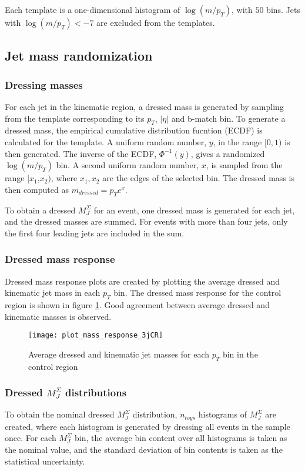 Each template is a one-dimensional histogram of $\log\left(m/p_{T}\right)$,
with $50$ bins. Jets with $\log\left(m/p_{T}\right)< -7$ are excluded
from the templates.
\subsection{Jet mass randomization}
\subsubsection{Dressing masses}
For each jet in the kinematic region, a dressed mass is generated by sampling from
the template corresponding to its $p_T$, $|\eta|$ and b-match bin. To
generate a dressed mass, the empirical cumulative distribution fucntion (ECDF)
is calculated for the template. A uniform random number, $y$, in the
range $[0,1)$ is then
generated. The inverse of the ECDF, $\Phi^{-1}(y)$, gives a randomized
$\log\left(m/p_T\right)$ bin. A second uniform random number, $x$, is sampled from the range
$[x_1$,$x_2)$, where $x_1,x_2$ are the edges of the selected bin. The
dressed mass is then computed as $m_{dressed} = p_{T}e^x$.

To obtain a dressed $M_{J}^{\Sigma}$ for an event, one dressed mass is
generated for each jet, and the dressed masses are summed. For
events with more than four jets, only the first four leading jets are
included in the sum.

\subsubsection{Dressed mass response}
Dressed mass response plots are created by plotting the average
dressed and kinematic jet mass in each $p_T$ bin. The dressed mass
response for the control region is shown in figure
\ref{fig:response_3jCR}. Good agreement between average dressed and
kinematic masses is observed. 

\begin{figure}[h]
\texttt{[image: plot\_mass\_response\_3jCR]}
\centering
\caption{Average dressed and kinematic jet masses for each $p_T$ bin
  in the control region}
\label{fig:response_3jCR}

\end{figure}

\subsubsection{Dressed $M_{J}^{\Sigma}$ distributions}
To obtain the nominal dressed $M_{J}^{\Sigma}$ distribution,
$n_{toys}$ histograms of $M_{J}^{\Sigma}$ are created, where each
histogram is generated by dressing all events in the sample once. For
each $M_{J}^{\Sigma}$ bin, the average bin content over all histograms is taken
as the nominal value, and the standard deviation of bin contents is
taken as the statistical uncertainty.

